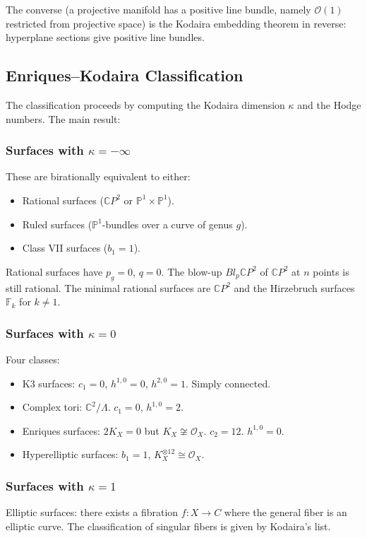 The converse (a projective manifold has a positive line bundle, namely $\mathcal{O}(1)$ restricted from projective space) is the Kodaira embedding theorem in reverse: hyperplane sections give positive line bundles.

\subsection{Enriques--Kodaira Classification}

The classification proceeds by computing the Kodaira dimension $\kappa$ and the Hodge numbers. The main result:

\subsubsection*{Surfaces with $\kappa = -\infty$}
These are birationally equivalent to either:
\begin{itemize}
    \item Rational surfaces ($\mathbb{C}P^2$ or $\mathbb{P}^1 \times \mathbb{P}^1$).
    \item Ruled surfaces ($\mathbb{P}^1$-bundles over a curve of genus $g$).
    \item Class VII surfaces ($b_1 = 1$).
\end{itemize}

Rational surfaces have $p_g = 0$, $q = 0$. The blow-up $Bl_p \mathbb{C}P^2$ of $\mathbb{C}P^2$ at $n$ points is still rational. The minimal rational surfaces are $\mathbb{C}P^2$ and the Hirzebruch surfaces $\mathbb{F}_k$ for $k \neq 1$.

\subsubsection*{Surfaces with $\kappa = 0$}
Four classes:
\begin{itemize}
    \item K3 surfaces: $c_1 = 0$, $h^{1,0} = 0$, $h^{2,0} = 1$. Simply connected.
    \item Complex tori: $\mathbb{C}^2 / \Lambda$. $c_1 = 0$, $h^{1,0} = 2$.
    \item Enriques surfaces: $2K_X = 0$ but $K_X \not\cong \mathcal{O}_X$. $c_2 = 12$. $h^{1,0} = 0$.
    \item Hyperelliptic surfaces: $b_1 = 1$, $K_X^{\otimes 12} \cong \mathcal{O}_X$.
\end{itemize}

\subsubsection*{Surfaces with $\kappa = 1$}
Elliptic surfaces: there exists a fibration $f: X \to C$ where the general fiber is an elliptic curve. The classification of singular fibers is given by Kodaira's list.

